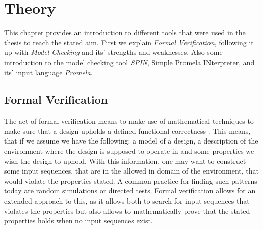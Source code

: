 \chapter{Theory}


This chapter provides an introduction to different tools that were used in the thesis to reach the stated aim. First we explain \textit{Formal Verification}, following it up with \textit{Model Checking} and its' strengths and weaknesses. Also some introduction to the model checking tool \textit{SPIN}, Simple Promela INterpreter, and its' input language \textit{Promela}. 




\section{Formal Verification}

The act of formal verification means to make use of mathematical techniques to make sure that a design upholds a defined functional correctness \cite{bjesse2005formal}.
This means, that if we assume we have the following: a model of a design, a description of the environment where the design is supposed to operate in and some properties we wish the design to uphold. With this information, one may want to construct some input sequences, that are in the allowed in domain of the environment, that would violate the properties stated. A common practice for finding such patterns today are random simulations or directed tests.
Formal verification allows for an extended approach to this, as it allows both to search for input sequences that violates the properties but also allows to mathematically prove that the stated properties holds when no input sequences exist.

